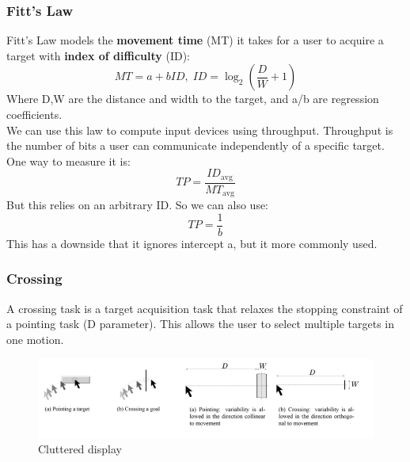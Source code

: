 \documentclass{article}
\begin{document}
\subsubsection*{Fitt's Law}
Fitt's Law models the \textbf{movement time} (MT) it takes for a user to acquire a target with \textbf{index of difficulty} (ID):
\[
MT = a + bID, \; ID = \log_2(\frac{D}{W}+1)
\]
Where D,W are the distance and width to the target, and a/b are regression coefficients. \\
We can use this law to compute input devices using throughput. Throughput is the number of bits a user can communicate independently of a specific target. One way to measure it is:
\[
TP = \frac{ID_{\text{avg}}}{MT_{\text{avg}}}
\]
But this relies on an arbitrary ID. So we can also use:
\[
TP = \frac{1}{b}
\]
This has a downside that it ignores intercept a, but it more commonly used.
\subsubsection*{Crossing}
A crossing task is a target acquisition task that relaxes the stopping constraint of a pointing task (D parameter). This allows the user to select multiple targets in one motion.
\begin{figure}[H]
    \centering
    \includegraphics[width=0.7\linewidth]{Pictures/Screenshot 2023-02-22 at 16.22.52.png}
    \caption{Cluttered display}
\end{figure}
\end{document}
